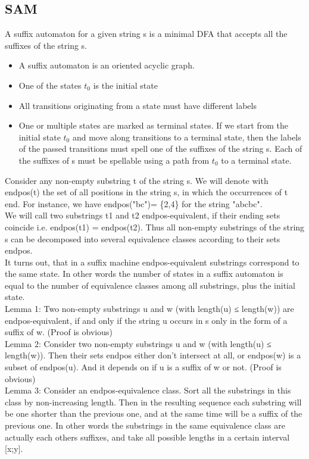 \documentclass[8pt, a4paper, oneside, twocolumn]{extarticle}
\begin{document}
\subsection{SAM}
A suffix automaton for a given string s is a minimal DFA that accepts all the suffixes of the string s.
\begin{itemize}
	\item A suffix automaton is an oriented acyclic graph.
	\item One of the states $t_0$ is the initial state
	\item All transitions originating from a state must have different labels
	\item One or multiple states are marked as terminal states. If we start from the initial state $t_0$ and move along transitions to a terminal state, then the labels of the passed transitions must spell one of the suffixes of the string s. Each of the suffixes of s must be spellable using a path from $t_0$ to a terminal state.
\end{itemize}
Consider any non-empty substring t of the string s. We will denote with endpos(t) the set of all positions in the string s, in which the occurrences of t end. For instance, we have endpos("bc")= \{2,4\} for the string "abcbc".\\
We will call two substrings t1 and t2 endpos-equivalent, if their ending sets coincide i.e. endpos(t1) = endpos(t2). Thus all non-empty substrings of the string s can be decomposed into several equivalence classes according to their sets endpos.\\
It turns out, that in a suffix machine endpos-equivalent substrings correspond to the same state. In other words the number of states in a suffix automaton is equal to the number of equivalence classes among all substrings, plus the initial state.\\
Lemma 1: Two non-empty substrings u and w (with length(u) ≤ length(w)) are endpos-equivalent, if and only if the string u occurs in s only in the form of a suffix of w. (Proof is obvious)\\
Lemma 2: Consider two non-empty substrings u and w (with length(u) ≤ length(w)). Then their sets endpos either don't intersect at all, or endpos(w) is a subset of endpos(u). And it depends on if u is a suffix of w or not. (Proof is obvious)\\
Lemma 3: Consider an endpos-equivalence class. Sort all the substrings in this class by non-increasing length. Then in the resulting sequence each substring will be one shorter than the previous one, and at the same time will be a suffix of the previous one. In other words the substrings in the same equivalence class are actually each others suffixes, and take all possible lengths in a certain interval [x;y].\\
\end{document}
